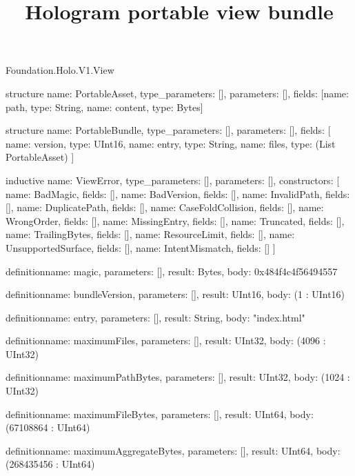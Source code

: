 \begin{lexlean}{Foundation.Holo.V1.View}
\title{Hologram portable view bundle}
\begin{semanticmodule}
structure{
  name: PortableAsset,
  type_parameters: [],
  parameters: [],
  fields: [{name: path, type: String}, {name: content, type: Bytes}]
}

structure{
  name: PortableBundle,
  type_parameters: [],
  parameters: [],
  fields: [
    {name: version, type: UInt16},
    {name: entry, type: String},
    {name: files, type: (List PortableAsset)}
  ]
}

inductive{
  name: ViewError,
  type_parameters: [],
  parameters: [],
  constructors: [
    {name: BadMagic, fields: []},
    {name: BadVersion, fields: []},
    {name: InvalidPath, fields: []},
    {name: DuplicatePath, fields: []},
    {name: CaseFoldCollision, fields: []},
    {name: WrongOrder, fields: []},
    {name: MissingEntry, fields: []},
    {name: Truncated, fields: []},
    {name: TrailingBytes, fields: []},
    {name: ResourceLimit, fields: []},
    {name: UnsupportedSurface, fields: []},
    {name: IntentMismatch, fields: []}
  ]
}

definition{name: magic, parameters: [], result: Bytes, body: 0x484f4c4f56494557}

definition{name: bundleVersion, parameters: [], result: UInt16, body: (1 : UInt16)}

definition{name: entry, parameters: [], result: String, body: "index.html"}

definition{name: maximumFiles, parameters: [], result: UInt32, body: (4096 : UInt32)}

definition{name: maximumPathBytes, parameters: [], result: UInt32, body: (1024 : UInt32)}

definition{name: maximumFileBytes, parameters: [], result: UInt64, body: (67108864 : UInt64)}

definition{name: maximumAggregateBytes, parameters: [], result: UInt64, body: (268435456 : UInt64)}
\end{semanticmodule}
\end{lexlean}
